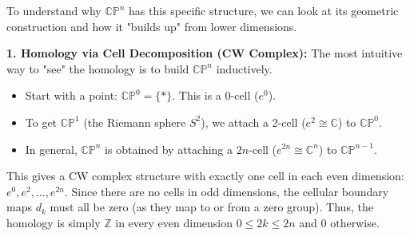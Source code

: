 \begin{remark}
To understand why $\mathbb{CP}^n$ has this specific structure, we can look at its geometric construction and how it "builds up" from lower dimensions.

\textbf{1. Homology via Cell Decomposition (CW Complex):}
The most intuitive way to "see" the homology is to build $\mathbb{CP}^n$ inductively.
\begin{itemize}
    \item Start with a point: $\mathbb{CP}^0 = \{*\}$. This is a 0-cell ($e^0$).
    \item To get $\mathbb{CP}^1$ (the Riemann sphere $S^2$), we attach a 2-cell ($e^2 \cong \mathbb{C}$) to $\mathbb{CP}^0$.
    \item In general, $\mathbb{CP}^n$ is obtained by attaching a $2n$-cell ($e^{2n} \cong \mathbb{C}^n$) to $\mathbb{CP}^{n-1}$.
\end{itemize}
This gives a CW complex structure with exactly one cell in each even dimension: $e^0, e^2, \dots, e^{2n}$. Since there are no cells in odd dimensions, the cellular boundary maps $d_k$ must all be zero (as they map to or from a zero group). Thus, the homology is simply $\mathbb{Z}$ in every even dimension $0 \le 2k \le 2n$ and $0$ otherwise.


\end{remark}
